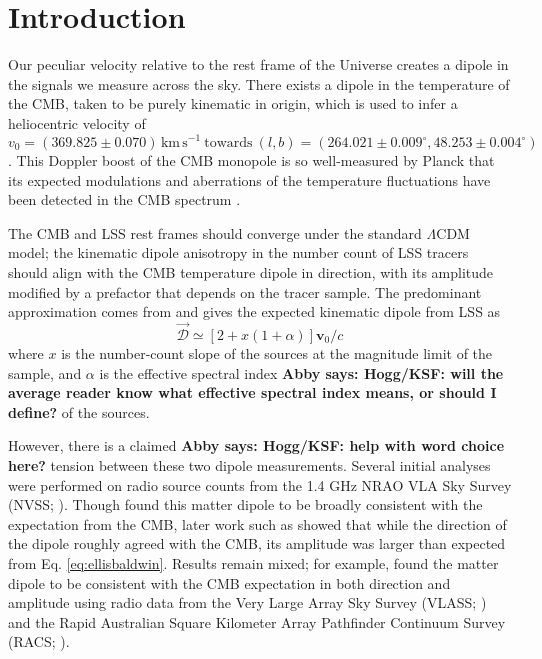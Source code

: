 \documentclass[modern]{aastex631}
\newcommand{\abby}[1]{\textbf{Abby says: #1}}
\newcommand{\vobs}{\boldsymbol{v}_0}
\begin{document}
\section{Introduction}
Our peculiar velocity relative to the rest frame of the Universe creates a dipole in the signals we measure across the sky.
There exists a dipole in the temperature of the CMB, taken to be purely kinematic in origin, which is used to infer a heliocentric velocity of
\begin{equation}
    \label{eq:CMB_velocity}
    v_0 = (369.825\pm 0.070)\,\mathrm{km\, s}^{-1}\ \mathrm{towards}\ (l,b) = (264.021\pm0.009^\circ, 48.253\pm0.004^\circ)
\end{equation}
\citep{planck_collaboration_planck_2020}.
This Doppler boost of the CMB monopole is so well-measured by Planck that its expected modulations and aberrations of the temperature fluctuations have been detected in the CMB spectrum \citep{planck_collaboration_planck_2014}.

The CMB and LSS rest frames should converge under the standard $\Lambda$CDM model; the kinematic dipole anisotropy in the number count of LSS tracers should align with the CMB temperature dipole in direction, with its amplitude modified by a prefactor that depends on the tracer sample.
The predominant approximation comes from \citet{ellis_expected_1984} and gives the expected kinematic dipole from LSS as
\begin{equation}
    \label{eq:ellisbaldwin}
    \vec{\mathcal{D}} \simeq \left[2+x(1+\alpha)\right]\vobs/c
\end{equation}
where $x$ is the number-count slope of the sources at the magnitude limit of the sample, and $\alpha$ is the effective spectral index \abby{Hogg/KSF: will the average reader know what effective spectral index means, or should I define?} of the sources.

However, there is a claimed \abby{Hogg/KSF: help with word choice here?} tension between these two dipole measurements.
Several initial analyses were performed on radio source counts from the 1.4 GHz NRAO VLA Sky Survey (NVSS; \citealt{condon_nrao_1998}).
Though \citet{blake_detection_2002} found this matter dipole to be broadly consistent with the expectation from the CMB, later work such as \citet{singal_large_2011} showed that while the direction of the dipole roughly agreed with the CMB, its amplitude was larger than expected from Eq. \ref{eq:ellisbaldwin}.
Results remain mixed; for example, \citet{darling_universe_2022} found the matter dipole to be consistent with the CMB expectation in both direction and amplitude using radio data from the Very Large Array Sky Survey (VLASS; \citealt{lacy_karl_2020}) and the Rapid
Australian Square Kilometer Array Pathfinder Continuum
Survey (RACS; \citealt{mcconnell_rapid_2020}).
\end{document}

